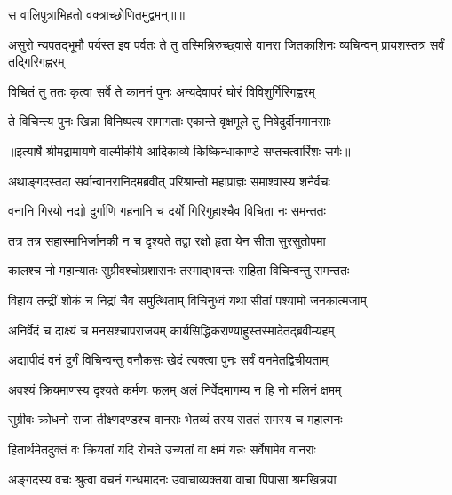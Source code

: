 \addtocounter{shlokacount}{1}

{स वालिपुत्राभिहतो वक्त्राच्छोणितमुद्वमन्॥॥} %

\addtocounter{shlokacount}{1}

\threelineshloka
{असुरो न्यपतद्भूमौ पर्यस्त इव पर्वतः}
{ते तु तस्मिन्निरुच्छ्वासे वानरा जितकाशिनः}
{व्यचिन्वन् प्रायशस्तत्र सर्वं तद्गिरिगह्वरम्} %

\twolineshloka
{विचितं तु ततः कृत्वा सर्वे ते काननं पुनः}
{अन्यदेवापरं घोरं विविशुर्गिरिगह्वरम्} %

\twolineshloka
{ते विचिन्त्य पुनः खिन्ना विनिष्पत्य समागताः}
{एकान्ते वृक्षमूले तु निषेदुर्दीनमानसाः} %


{॥इत्यार्षे श्रीमद्रामायणे वाल्मीकीये आदिकाव्ये किष्किन्धाकाण्डे सप्तचत्वारिंशः सर्गः॥}


\twolineshloka
{अथाङ्गदस्तदा सर्वान्वानरानिदमब्रवीत्}
{परिश्रान्तो महाप्राज्ञः समाश्वास्य शनैर्वचः} %

\twolineshloka
{वनानि गिरयो नद्यो दुर्गाणि गहनानि च}
{दर्यो गिरिगुहाश्चैव विचिता नः समन्ततः} %

\twolineshloka
{तत्र तत्र सहास्माभिर्जानकी न च दृश्यते}
{तद्वा रक्षो हृता येन सीता सुरसुतोपमा} %

\twolineshloka
{कालश्च नो महान्यातः सुग्रीवश्चोग्रशासनः}
{तस्माद्भवन्तः सहिता विचिन्वन्तु समन्ततः} %

\twolineshloka
{विहाय तन्द्रीं शोकं च निद्रां चैव समुत्थिताम्}
{विचिनुध्वं यथा सीतां पश्यामो जनकात्मजाम्} %

\twolineshloka
{अनिर्वेदं च दाक्ष्यं च मनसश्चापराजयम्}
{कार्यसिद्धिकराण्याहुस्तस्मादेतद्ब्रवीम्यहम्} %

\twolineshloka
{अद्यापीदं वनं दुर्गं विचिन्वन्तु वनौकसः}
{खेदं त्यक्त्वा पुनः सर्वं वनमेतद्विचीयताम्} %

\twolineshloka
{अवश्यं क्रियमाणस्य दृश्यते कर्मणः फलम्}
{अलं निर्वेदमागम्य न हि नो मलिनं क्षमम्} %

\twolineshloka
{सुग्रीवः क्रोधनो राजा तीक्ष्णदण्डश्च वानराः}
{भेतव्यं तस्य सततं रामस्य च महात्मनः} %

\twolineshloka
{हितार्थमेतदुक्तं वः क्रियतां यदि रोचते}
{उच्यतां वा क्षमं यन्नः सर्वेषामेव वानराः} %

\twolineshloka
{अङ्गदस्य वचः श्रुत्वा वचनं गन्धमादनः}
{उवाचाव्यक्तया वाचा पिपासा श्रमखिन्नया} %

